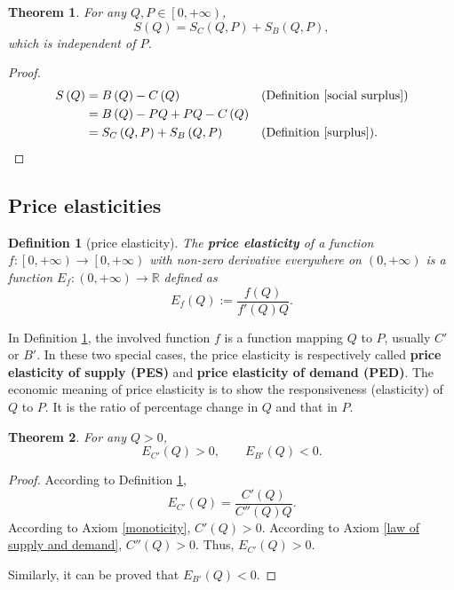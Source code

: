 \documentclass{article}
\newtheorem{theorem}{Theorem}[subsection]
\newtheorem{definition}{Definition}[subsection]
\begin{document}
\begin{theorem}
For any $Q,P\in\left[0,+\infty\right)$,
$$S\left(Q\right)=S_C\left(Q,P\right)+S_B\left(Q,P\right),$$
which is independent of $P$.
\end{theorem}
\begin{proof}
\begin{align*}
S\left(Q\right)&=B\left(Q\right)-C\left(Q\right)&&\text{(Definition \ref{social surplus})}\\
&=B\left(Q\right)-PQ+PQ-C\left(Q\right)\\
&=S_C\left(Q,P\right)+S_B\left(Q,P\right)&&\text{(Definition \ref{surplus})}.
\end{align*}
\end{proof}

\subsection{Price elasticities}

\begin{definition}[price elasticity]
\label{price elasticity}
The \textbf{price elasticity} of a function $f:\left[0,+\infty\right)\to\left[0,+\infty\right)$ with non-zero derivative everywhere on $\left(0,+\infty\right)$
is a function $E_f:\left(0,+\infty\right)\to\mathbb R$ defined as
$$E_f\left(Q\right):=\frac{f\left(Q\right)}{f'\left(Q\right)Q}.$$
\end{definition}

In Definition \ref{price elasticity}, the involved function $f$ is a function mapping $Q$ to $P$, usually $C'$ or $B'$.
In these two special cases, the price elasticity is respectively called \textbf{price elasticity of supply (PES)} and \textbf{price elasticity of demand (PED)}.
The economic meaning of price elasticity is to show the responsiveness (elasticity) of $Q$ to $P$.
It is the ratio of percentage change in $Q$ and that in $P$.

\begin{theorem}
\label{sign of price elasticity}
For any $Q>0$,
$$E_{C'}\left(Q\right)>0,
\qquad E_{B'}\left(Q\right)<0.$$
\end{theorem}
\begin{proof}
According to Definition \ref{price elasticity},
$$E_{C'}\left(Q\right)=\frac{C'\left(Q\right)}{C''\left(Q\right)Q}.$$
According to Axiom \ref{monoticity}, $C'\left(Q\right)>0$.
According to Axiom \ref{law of supply and demand}, $C''\left(Q\right)>0$.
Thus, $E_{C'}\left(Q\right)>0$.

Similarly, it can be proved that $E_{B'}\left(Q\right)<0$.
\end{proof}
\end{document}
